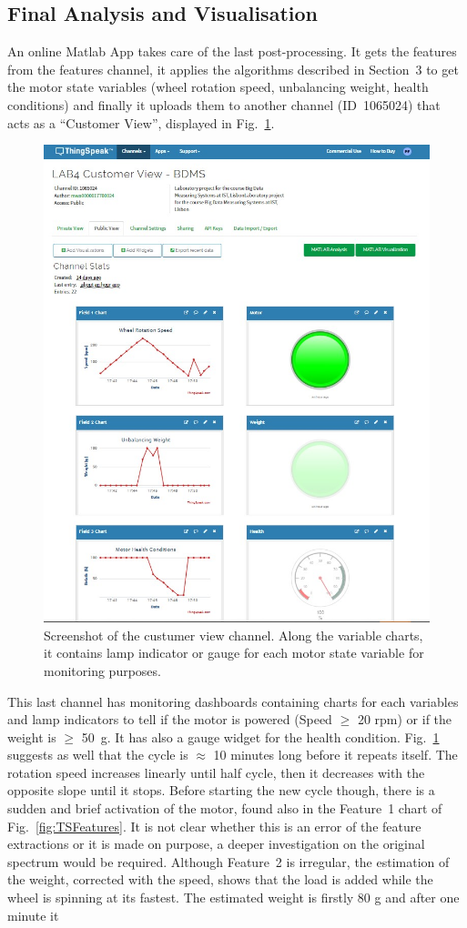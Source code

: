 \documentclass[12pt]{article}
\begin{document}
\subsection{Final Analysis and Visualisation}
An online Matlab App takes care of the last post-processing. It gets the features from the features channel, it applies the algorithms described in Section~3 to get the motor state variables (wheel rotation speed, unbalancing weight, health conditions) and finally it uploads them to another channel (ID~1065024) that acts as a ``Customer View'', displayed in Fig.~\ref{fig:TFCustomer}.
\begin{figure}[t!]
	\centering
	\includegraphics[width=0.9\linewidth]{Figures/TFCusomer}
	\caption{Screenshot of the custumer view channel. Along the variable charts, it contains lamp indicator or gauge for each motor state variable for monitoring purposes.}
	\label{fig:TFCustomer}
\end{figure}
This last channel has monitoring dashboards containing charts for each variables and lamp indicators to tell if the motor is powered (Speed $\geq$ 20 rpm) or if the weight is $\geq$ 50~g. It has also a gauge widget for the health condition.
Fig.~\ref{fig:TFCustomer} suggests as well that the cycle is $\approx$ 10 minutes long before it repeats itself. The rotation speed increases linearly until half cycle, then it decreases with the opposite slope until it stops. Before starting the new cycle though, there is a sudden and brief activation of the motor, found also in the Feature~1 chart of Fig.~\ref{fig:TSFeatures}. It is not clear whether this is an error of the feature extractions or it is made on purpose, a deeper investigation on the original spectrum would be required. Although Feature~2 is irregular, the estimation of the weight, corrected with the speed, shows that the load is added while the wheel is spinning at its fastest. The estimated weight is firstly 80 g and after one minute it
\end{document}

